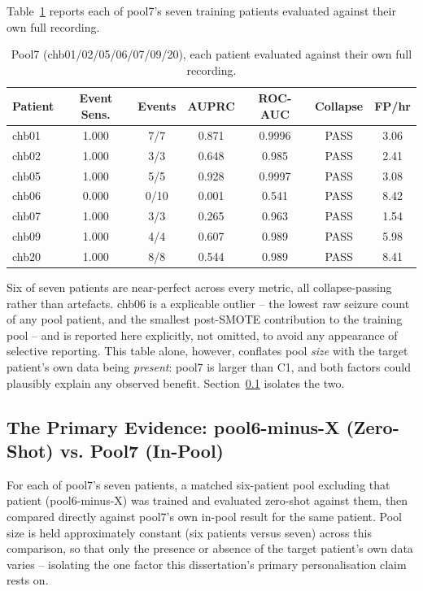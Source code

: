 Table~\ref{tab:pool7-owndata} reports each of pool7's seven training patients evaluated against their own full recording.

\begin{table}[H]
\centering
\caption{Pool7 (chb01/02/05/06/07/09/20), each patient evaluated against their own full recording.}
\label{tab:pool7-owndata}
\begin{tabular}{lcccccc}
\toprule
Patient & Event Sens. & Events & AUPRC & ROC-AUC & Collapse & FP/hr \\
\midrule
chb01 & 1.000 & 7/7  & 0.871 & 0.9996 & PASS & 3.06 \\
chb02 & 1.000 & 3/3  & 0.648 & 0.985  & PASS & 2.41 \\
chb05 & 1.000 & 5/5  & 0.928 & 0.9997 & PASS & 3.08 \\
chb06 & 0.000 & 0/10 & 0.001 & 0.541  & PASS & 8.42 \\
chb07 & 1.000 & 3/3  & 0.265 & 0.963  & PASS & 1.54 \\
chb09 & 1.000 & 4/4  & 0.607 & 0.989  & PASS & 5.98 \\
chb20 & 1.000 & 8/8  & 0.544 & 0.989  & PASS & 8.41 \\
\bottomrule
\end{tabular}
\end{table}

Six of seven patients are near-perfect across every metric, all collapse-passing rather than artefacts. chb06 is a explicable outlier -- the lowest raw seizure count of any pool patient, and the smallest post-SMOTE contribution to the training pool -- and is reported here explicitly, not omitted, to avoid any appearance of selective reporting. This table alone, however, conflates pool \emph{size} with the target patient's own data being \emph{present}: pool7 is larger than C1, and both factors could plausibly explain any observed benefit. Section~\ref{sec:pool6-minus-x} isolates the two.

\subsection{The Primary Evidence: pool6-minus-X (Zero-Shot) vs. Pool7 (In-Pool)}
\label{sec:pool6-minus-x}

For each of pool7's seven patients, a matched six-patient pool excluding that patient (pool6-minus-X) was trained and evaluated zero-shot against them, then compared directly against pool7's own in-pool result for the same patient. Pool size is held approximately constant (six patients versus seven) across this comparison, so that only the presence or absence of the target patient's own data varies -- isolating the one factor this dissertation's primary personalisation claim rests on.

